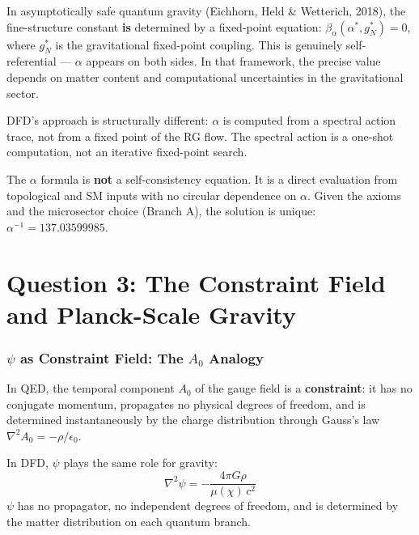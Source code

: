 \documentclass[12pt,a4paper]{article}
\begin{document}
In asymptotically safe quantum gravity (Eichhorn, Held \& Wetterich, 2018), the fine-structure constant \textbf{is} determined by a fixed-point equation: $\beta_\alpha(\alpha^*, g^*_N) = 0$, where $g^*_N$ is the gravitational fixed-point coupling. This is genuinely self-referential --- $\alpha$ appears on both sides. In that framework, the precise value depends on matter content and computational uncertainties in the gravitational sector.

DFD's approach is structurally different: $\alpha$ is computed from a spectral action trace, not from a fixed point of the RG flow. The spectral action is a one-shot computation, not an iterative fixed-point search.

\begin{tcolorbox}[colback=blue!5!white, colframe=blue!60!black, title=Answer to Question 2]
The $\alpha$ formula is \textbf{not} a self-consistency equation. It is a direct evaluation from topological and SM inputs with no circular dependence on $\alpha$. Given the axioms and the microsector choice (Branch A), the solution is unique: $\alpha^{-1} = 137.03599985$.
\end{tcolorbox}


\part{Question 3: The Constraint Field and Planck-Scale Gravity}
\label{part:q3}

\section{$\psi$ as Constraint Field: The $A_0$ Analogy}

In QED, the temporal component $A_0$ of the gauge field is a \textbf{constraint}: it has no conjugate momentum, propagates no physical degrees of freedom, and is determined instantaneously by the charge distribution through Gauss's law $\nabla^2 A_0 = -\rho/\epsilon_0$.

In DFD, $\psi$ plays the same role for gravity:
\begin{equation}
\nabla^2\psi = -\frac{4\pi G\rho}{\mu(\chi)\,c^2}
\label{eq:constraint}
\end{equation}
$\psi$ has no propagator, no independent degrees of freedom, and is determined by the matter distribution on each quantum branch.
\end{document}

